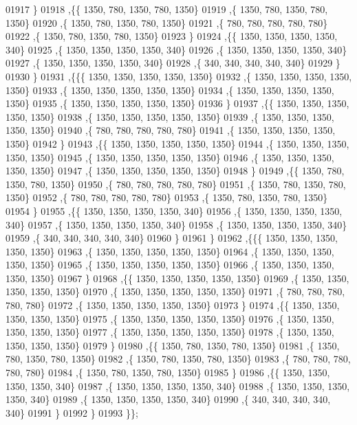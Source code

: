 \begin{DoxyCode}
01917    \}
01918   ,\{\{  1350,   780,  1350,   780,  1350\}
01919    ,\{  1350,   780,  1350,   780,  1350\}
01920    ,\{  1350,   780,  1350,   780,  1350\}
01921    ,\{   780,   780,   780,   780,   780\}
01922    ,\{  1350,   780,  1350,   780,  1350\}
01923    \}
01924   ,\{\{  1350,  1350,  1350,  1350,   340\}
01925    ,\{  1350,  1350,  1350,  1350,   340\}
01926    ,\{  1350,  1350,  1350,  1350,   340\}
01927    ,\{  1350,  1350,  1350,  1350,   340\}
01928    ,\{   340,   340,   340,   340,   340\}
01929    \}
01930   \}
01931  ,\{\{\{  1350,  1350,  1350,  1350,  1350\}
01932    ,\{  1350,  1350,  1350,  1350,  1350\}
01933    ,\{  1350,  1350,  1350,  1350,  1350\}
01934    ,\{  1350,  1350,  1350,  1350,  1350\}
01935    ,\{  1350,  1350,  1350,  1350,  1350\}
01936    \}
01937   ,\{\{  1350,  1350,  1350,  1350,  1350\}
01938    ,\{  1350,  1350,  1350,  1350,  1350\}
01939    ,\{  1350,  1350,  1350,  1350,  1350\}
01940    ,\{   780,   780,   780,   780,   780\}
01941    ,\{  1350,  1350,  1350,  1350,  1350\}
01942    \}
01943   ,\{\{  1350,  1350,  1350,  1350,  1350\}
01944    ,\{  1350,  1350,  1350,  1350,  1350\}
01945    ,\{  1350,  1350,  1350,  1350,  1350\}
01946    ,\{  1350,  1350,  1350,  1350,  1350\}
01947    ,\{  1350,  1350,  1350,  1350,  1350\}
01948    \}
01949   ,\{\{  1350,   780,  1350,   780,  1350\}
01950    ,\{   780,   780,   780,   780,   780\}
01951    ,\{  1350,   780,  1350,   780,  1350\}
01952    ,\{   780,   780,   780,   780,   780\}
01953    ,\{  1350,   780,  1350,   780,  1350\}
01954    \}
01955   ,\{\{  1350,  1350,  1350,  1350,   340\}
01956    ,\{  1350,  1350,  1350,  1350,   340\}
01957    ,\{  1350,  1350,  1350,  1350,   340\}
01958    ,\{  1350,  1350,  1350,  1350,   340\}
01959    ,\{   340,   340,   340,   340,   340\}
01960    \}
01961   \}
01962  ,\{\{\{  1350,  1350,  1350,  1350,  1350\}
01963    ,\{  1350,  1350,  1350,  1350,  1350\}
01964    ,\{  1350,  1350,  1350,  1350,  1350\}
01965    ,\{  1350,  1350,  1350,  1350,  1350\}
01966    ,\{  1350,  1350,  1350,  1350,  1350\}
01967    \}
01968   ,\{\{  1350,  1350,  1350,  1350,  1350\}
01969    ,\{  1350,  1350,  1350,  1350,  1350\}
01970    ,\{  1350,  1350,  1350,  1350,  1350\}
01971    ,\{   780,   780,   780,   780,   780\}
01972    ,\{  1350,  1350,  1350,  1350,  1350\}
01973    \}
01974   ,\{\{  1350,  1350,  1350,  1350,  1350\}
01975    ,\{  1350,  1350,  1350,  1350,  1350\}
01976    ,\{  1350,  1350,  1350,  1350,  1350\}
01977    ,\{  1350,  1350,  1350,  1350,  1350\}
01978    ,\{  1350,  1350,  1350,  1350,  1350\}
01979    \}
01980   ,\{\{  1350,   780,  1350,   780,  1350\}
01981    ,\{  1350,   780,  1350,   780,  1350\}
01982    ,\{  1350,   780,  1350,   780,  1350\}
01983    ,\{   780,   780,   780,   780,   780\}
01984    ,\{  1350,   780,  1350,   780,  1350\}
01985    \}
01986   ,\{\{  1350,  1350,  1350,  1350,   340\}
01987    ,\{  1350,  1350,  1350,  1350,   340\}
01988    ,\{  1350,  1350,  1350,  1350,   340\}
01989    ,\{  1350,  1350,  1350,  1350,   340\}
01990    ,\{   340,   340,   340,   340,   340\}
01991    \}
01992   \}
01993  \}\};
\end{DoxyCode}
